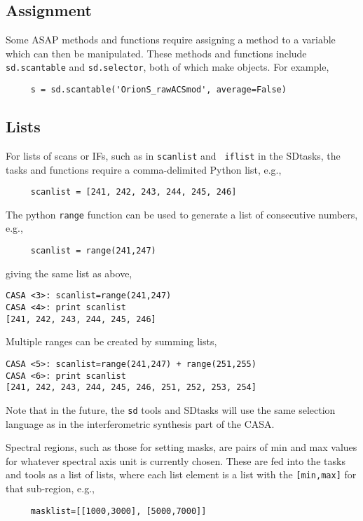 \subsection{Assignment}
\label{section:sd.intro.ass}

Some ASAP methods and functions require assigning a method
to a variable which can then be manipulated.  These methods and functions include
{\tt sd.scantable} and {\tt sd.selector}, both of which make objects.
For example,
\small
\begin{verbatim}
     s = sd.scantable('OrionS_rawACSmod', average=False) 
\end{verbatim}
\normalsize

\subsection{Lists}
\label{section:sd.intro.lists}

For lists of scans or IFs, such as in {\tt scanlist} and {\tt
iflist} in the SDtasks, the tasks and functions require a comma-delimited 
Python list, e.g.,
\small
\begin{verbatim}
     scanlist = [241, 242, 243, 244, 245, 246] 
\end{verbatim}
\normalsize
The python {\tt range} function can be used to generate a list of
consecutive numbers, e.g.,
\small
\begin{verbatim}
     scanlist = range(241,247) 
\end{verbatim}
\normalsize
giving the same list as above,
\small
\begin{verbatim}
CASA <3>: scanlist=range(241,247)
CASA <4>: print scanlist
[241, 242, 243, 244, 245, 246] 
\end{verbatim}
\normalsize
Multiple ranges can be created by summing lists,
\small
\begin{verbatim}
CASA <5>: scanlist=range(241,247) + range(251,255)
CASA <6>: print scanlist
[241, 242, 243, 244, 245, 246, 251, 252, 253, 254] 
\end{verbatim}
\normalsize
Note that in the future, the {\tt sd} tools and SDtasks will use
the same selection language as in the interferometric synthesis part of the CASA.

Spectral regions, such as those for setting masks, are pairs of
min and max values for whatever spectral axis unit is currently
chosen.  These are fed into the tasks and tools as a list of lists,
where each list element is a list with the {\tt [min,max]} for that
sub-region, e.g.,
\small
\begin{verbatim}
     masklist=[[1000,3000], [5000,7000]] 
\end{verbatim}
\normalsize

